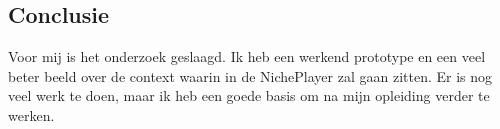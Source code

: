 \subsection{Conclusie}
Voor mij is het onderzoek geslaagd. Ik heb een werkend prototype en een veel beter beeld over de context waarin in de NichePlayer zal gaan zitten. Er is nog veel werk te doen, maar ik heb een goede basis om na mijn opleiding verder te werken.


